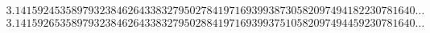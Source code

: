 \documentclass[preview]{standalone}
\begin{document}
\begin{align*}
3.14159245358979323846264338327950278419716939938730582097494182230781640\ldots \\ 3.141592 6 53589793238462643383279502 8 841971693993 7 5 1 0582097494 459 230781640\ldots
\end{align*}
\end{document}
